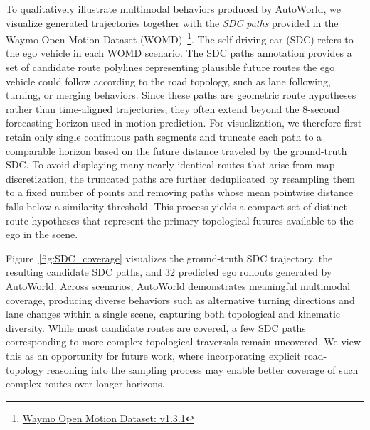 \documentclass[runningheads]{llncs}
\begin{document}
To qualitatively illustrate multimodal behaviors produced by AutoWorld, we visualize generated trajectories together with the \emph{SDC paths} provided in the Waymo Open Motion Dataset (WOMD)~\cite{ettinger2021large}\footnote{\href{https://waymo.com/intl/es/open/download/\#:~:text=\%5Bnew\%5D\%20v1.3.1\%20Oct\%202025\%3A\%20Added\%20sdc_paths\%2C\%20which\%20are\%20a\%20new\%20WOMD\%20feature\%20indicating\%20example\%20valid\%20future\%20routes\%20that\%20the\%20self\%2Ddriving\%20car\%20(SDC)\%20could\%20take.\%20Check\%20out\%20the\%20sdc_paths\%20demo\%20on\%20GitHub\%20to\%20get\%20started.\%20\%2D\%20files}{Waymo Open Motion Dataset: v1.3.1}}. The self-driving car (SDC) refers to the ego vehicle in each WOMD scenario. The SDC paths annotation provides a set of candidate route polylines representing plausible future routes the ego vehicle could follow according to the road topology, such as lane following, turning, or merging behaviors. Since these paths are geometric route hypotheses rather than time-aligned trajectories, they often extend beyond the 8-second forecasting horizon used in motion prediction. For visualization, we therefore first retain only single continuous path segments and truncate each path to a comparable horizon based on the future distance traveled by the ground-truth SDC. To avoid displaying many nearly identical routes that arise from map discretization, the truncated paths are further deduplicated by resampling them to a fixed number of points and removing paths whose mean pointwise distance falls below a similarity threshold. This process yields a compact set of distinct route hypotheses that represent the primary topological futures available to the ego in the scene.

Figure~\ref{fig:SDC_coverage} visualizes the ground-truth SDC trajectory, the resulting candidate SDC paths, and 32 predicted ego rollouts generated by AutoWorld. Across scenarios, AutoWorld demonstrates meaningful multimodal coverage, producing diverse behaviors such as alternative turning directions and lane changes within a single scene, capturing both topological and kinematic diversity. While most candidate routes are covered, a few SDC paths corresponding to more complex topological traversals remain uncovered. We view this as an opportunity for future work, where incorporating explicit road-topology reasoning into the sampling process may enable better coverage of such complex routes over longer horizons.
\end{document}
